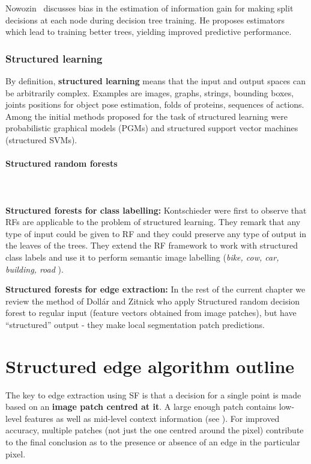 Nowozin~\cite{Nowozin12improvedinformation,nowozin2014decision} discusses bias in the estimation of information gain for making split decisions at each node during decision tree training. He proposes estimators which lead to training better trees, yielding improved predictive performance.

\subsubsection{Structured learning}
By definition, {\bf structured learning} means that the input and output spaces can be arbitrarily complex. Examples are images, graphs, strings, bounding boxes, joints positions for object pose estimation, folds of proteins, sequences of actions. Among the initial methods proposed for the task of structured learning were probabilistic graphical models (PGMs) and structured support vector machines (structured SVMs).

\paragraph{Structured random forests}\mbox{}\\\mbox{}\\
\textbf{Structured forests for class labelling:} Kontschieder \etal \cite{KontschiederBBP11} were first to observe that RFs are applicable to the problem of structured learning. They remark that any type of input could be given to RF and they could preserve %
any type of output in the leaves of the trees. They extend the RF framework to work with structured class labels and use it to perform semantic image labelling (\textit{bike, cow, car, building, road \etc}).

\textbf{Structured forests for edge extraction:} In the rest of the current chapter %
we review the method of Doll{\'a}r and Zitnick \cite{DollarICCV13edges,Dollar2015PAMI} who apply Structured random decision forest to regular input (feature vectors obtained from image patches), but have ``structured'' output - they make local segmentation patch predictions.

\section{Structured edge algorithm outline}
The key to edge extraction using SF is that a decision for a single point is made based on an {\bf image patch centred at it}. A large enough patch contains low-level features as well as mid-level context information (see ). For improved accuracy, multiple patches (not just the one centred around the pixel) contribute to the final conclusion as to the presence or absence of an edge in the particular pixel. %


